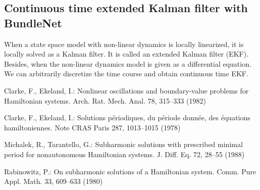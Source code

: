 \documentclass{article}
\begin{document}
\subsection{Continuous time extended Kalman filter with BundleNet}
When a state space model with non-linear dynamics is locally linearized, it is locally solved as a Kalman filter. It is called an extended Kalman filter (EKF). Besides, when the non-linear dynamics model is given as a differential equation. We can arbitrarily discretize the time course and obtain continuous time EKF.


%
\begin{thebibliography}{5}
%
Clarke, F., Ekeland, I.:
Nonlinear oscillations and
boundary-value problems for Hamiltonian systems.
Arch. Rat. Mech. Anal. 78, 315--333 (1982)

Clarke, F., Ekeland, I.:
Solutions p\'{e}riodiques, du
p\'{e}riode donn\'{e}e, des \'{e}quations hamiltoniennes.
Note CRAS Paris 287, 1013--1015 (1978)

Michalek, R., Tarantello, G.:
Subharmonic solutions with prescribed minimal
period for nonautonomous Hamiltonian systems.
J. Diff. Eq. 72, 28--55 (1988)

Rabinowitz, P.:
On subharmonic solutions of a Hamiltonian system.
Comm. Pure Appl. Math. 33, 609--633 (1980)

\end{thebibliography}
\end{document}
